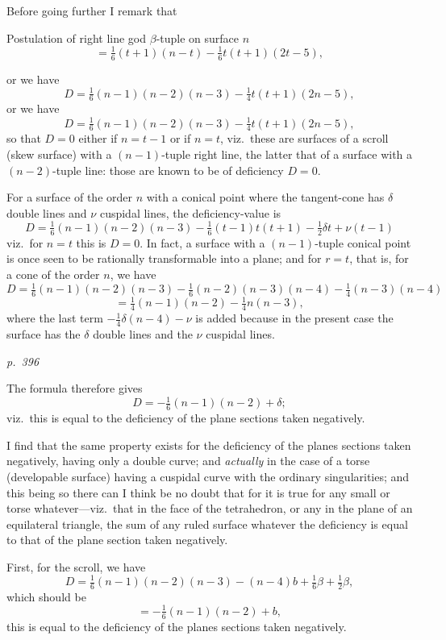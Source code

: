 \documentclass[11pt,a4paper]{article}
\theoremstyle{plain}
\theoremstyle{definition}
\begin{document}
Before going further I remark that
\begin{center}
Postulation of right line god $\beta$-tuple on surface $n$
\[
= \tfrac{1}{6}(t + 1)(n - t) - \tfrac{1}{6}t(t + 1)(2t - 5),
\]
\end{center}
or we have
\[
D = \tfrac{1}{6}(n - 1)(n - 2)(n - 3) - \tfrac{1}{4}t(t + 1)(2n - 5),
\]
or we have
\[
D = \tfrac{1}{6}(n - 1)(n - 2)(n - 3) - \tfrac{1}{4}t(t + 1)(2n - 5),
\]
so that $D = 0$ either if $n = t - 1$ or if $n = t$, viz.\ these are surfaces of a scroll
(skew surface) with a $(n - 1)$-tuple right line, the latter that of a surface with a
$(n - 2)$-tuple line: those are known to be of deficiency $D = 0$.

For a surface of the order $n$ with a conical point where the tangent-cone has
$\delta$ double lines and $\nu$ cuspidal lines, the deficiency-value is
\[
D = \tfrac{1}{6}(n - 1)(n - 2)(n - 3) - \tfrac{1}{6}(t - 1)t(t + 1) - \tfrac{1}{2}\delta t + \nu(t - 1)
\]
viz.\ for $n = t$ this is $D = 0$.  In fact, a surface with a $(n - 1)$-tuple conical point is
once seen to be rationally transformable into a plane; and for $r = t$, that is, for a
cone of the order $n$, we have
\[
D = \tfrac{1}{6}(n - 1)(n - 2)(n - 3) - \tfrac{1}{6}(n - 2)(n - 3)(n - 4) - \tfrac{1}{4}(n - 3)(n - 4)
\]
\[
= \tfrac{1}{4}(n - 1)(n - 2) - \tfrac{1}{4}n(n - 3),
\]
where the last term $-\tfrac{1}{4}\delta(n - 4) - \nu$ is added because in the present case the surface
has the $\delta$ double lines and the $\nu$ cuspidal lines.

\clearpage

\bigskip
\textit{p.~396}
\smallskip

\noindent
The formula therefore gives
\[
D = -\tfrac{1}{6}(n - 1)(n - 2) + \delta;
\]
viz.\ this is equal to the deficiency of the plane sections taken negatively.

I find that the same property exists for the deficiency of the planes sections taken negatively,
having only a double curve; and \textit{actually} in the case of a torse (developable surface)
having a cuspidal curve with the ordinary singularities; and this being so there can
I think be no doubt that for it is true for any small or torse whatever---viz.\ that
in the face of the tetrahedron, or any in the plane of an equilateral triangle, the sum
of any ruled surface whatever the deficiency is equal to that of the plane section
taken negatively.

First, for the scroll, we have
\[
D = \tfrac{1}{6}(n - 1)(n - 2)(n - 3) - (n - 4)b + \tfrac{1}{6}\beta + \tfrac{1}{2}\beta,
\]
which should be
\[
= -\tfrac{1}{6}(n - 1)(n - 2) + b,
\]
this is equal to the deficiency of the planes sections taken negatively.
\end{document}
